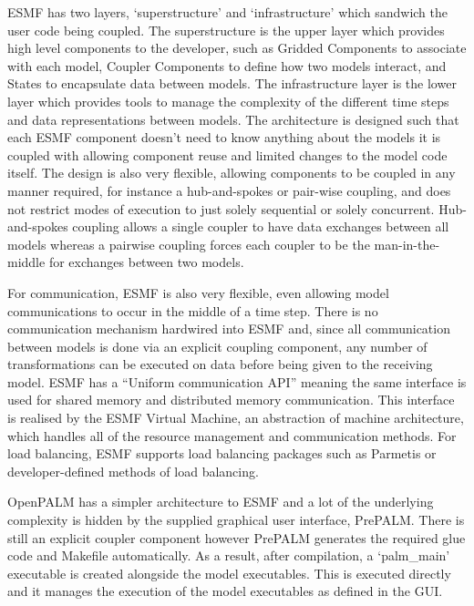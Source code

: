 ESMF has two layers, `superstructure' and `infrastructure' which sandwich the
user code being coupled. The superstructure is the upper layer which provides
high level components to the developer, such as Gridded Components to associate
with each model, Coupler Components to define how two models interact, and
States to encapsulate data between models. The infrastructure layer is the lower
layer which provides tools to manage the complexity of the different time steps
and data representations between models. The architecture is designed such that
each ESMF component doesn't need to know anything about the models it is coupled
with allowing component reuse and limited changes to the model code itself. The
design is also very flexible, allowing components to be coupled in any manner
required, for instance a hub-and-spokes or pair-wise coupling, and does not
restrict modes of execution to just solely sequential or solely concurrent.
Hub-and-spokes coupling allows a single coupler to have data exchanges between
all models whereas a pairwise coupling forces each coupler to be the
man-in-the-middle for exchanges between two models.

For communication, ESMF is also very flexible, even allowing model
communications to occur in the middle of a time step. There is no communication
mechanism hardwired into ESMF and, since all communication between models is
done via an explicit coupling component, any number of transformations can be
executed on data before being given to the receiving model. ESMF has a ``Uniform
communication API'' \cite{ESMF2014} meaning the same interface is used for
shared memory and distributed memory communication. This interface is realised
by the ESMF Virtual Machine, an abstraction of machine architecture, which
handles all of the resource management and communication methods. For load
balancing, ESMF supports load balancing packages such as Parmetis
\cite{Hoefler2010,Karypis1998} or developer-defined methods of load balancing.

OpenPALM has a simpler architecture to ESMF and a lot of the underlying
complexity is hidden by the supplied graphical user interface, PrePALM. There is
still an explicit coupler component however PrePALM generates the required glue
code and Makefile automatically. As a result, after compilation, a `palm\_main'
executable is created alongside the model executables. This is executed directly
and it manages the execution of the model executables as defined in the GUI.

